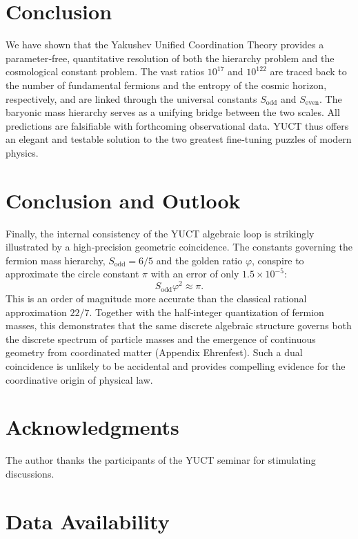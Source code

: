 \documentclass[12pt,a4paper]{article}
\begin{document}
	\section{Conclusion}
	
	We have shown that the Yakushev Unified Coordination Theory provides a parameter‑free, quantitative resolution of both the hierarchy problem and the cosmological constant problem. The vast ratios $10^{17}$ and $10^{122}$ are traced back to the number of fundamental fermions and the entropy of the cosmic horizon, respectively, and are linked through the universal constants $S_{\mathrm{odd}}$ and $S_{\mathrm{even}}$. The baryonic mass hierarchy serves as a unifying bridge between the two scales. All predictions are falsifiable with forthcoming observational data. YUCT thus offers an elegant and testable solution to the two greatest fine‑tuning puzzles of modern physics.
	
\section*{Conclusion and Outlook}

Finally, the internal consistency of the YUCT algebraic loop is strikingly illustrated by a high‑precision geometric coincidence. The constants governing the fermion mass hierarchy, \(S_{\mathrm{odd}}=6/5\) and the golden ratio \(\varphi\), conspire to approximate the circle constant \(\pi\) with an error of only \(1.5\times10^{-5}\):
\[
S_{\mathrm{odd}}\varphi^2 \approx \pi .
\]
This is an order of magnitude more accurate than the classical rational approximation \(22/7\). Together with the half‑integer quantization of fermion masses, this demonstrates that the same discrete algebraic structure governs both the discrete spectrum of particle masses and the emergence of continuous geometry from coordinated matter (Appendix Ehrenfest). Such a dual coincidence is unlikely to be accidental and provides compelling evidence for the coordinative origin of physical law.

	\section*{Acknowledgments}
	
	The author thanks the participants of the YUCT seminar for stimulating discussions.
	
	\section*{Data Availability}
	
\end{document}
